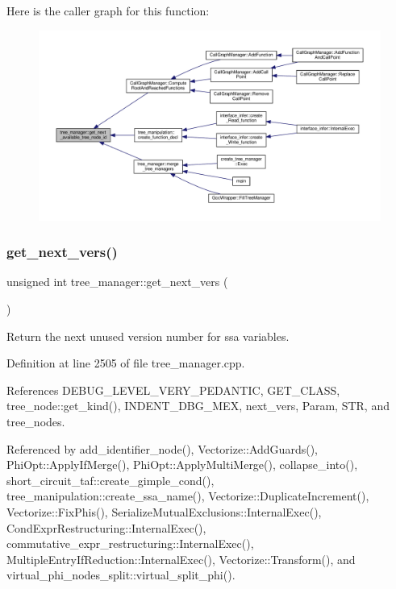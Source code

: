 Here is the caller graph for this function\+:
\nopagebreak
\begin{figure}[H]
\begin{center}
\leavevmode
\includegraphics[width=350pt]{d2/ddd/classtree__manager_a7adac56ed0eef2f391ac2a7ee691f04e_icgraph}
\end{center}
\end{figure}
\mbox{\label{classtree__manager_a7cf60d6250535345f863880c615e7d95}} 
\subsubsection{\texorpdfstring{get\+\_\+next\+\_\+vers()}{get\_next\_vers()}}
{\footnotesize\ttfamily unsigned int tree\+\_\+manager\+::get\+\_\+next\+\_\+vers (\begin{DoxyParamCaption}{ }\end{DoxyParamCaption})}



Return the next unused version number for ssa variables. 



Definition at line 2505 of file tree\+\_\+manager.\+cpp.



References D\+E\+B\+U\+G\+\_\+\+L\+E\+V\+E\+L\+\_\+\+V\+E\+R\+Y\+\_\+\+P\+E\+D\+A\+N\+T\+IC, G\+E\+T\+\_\+\+C\+L\+A\+SS, tree\+\_\+node\+::get\+\_\+kind(), I\+N\+D\+E\+N\+T\+\_\+\+D\+B\+G\+\_\+\+M\+EX, next\+\_\+vers, Param, S\+TR, and tree\+\_\+nodes.



Referenced by add\+\_\+identifier\+\_\+node(), Vectorize\+::\+Add\+Guards(), Phi\+Opt\+::\+Apply\+If\+Merge(), Phi\+Opt\+::\+Apply\+Multi\+Merge(), collapse\+\_\+into(), short\+\_\+circuit\+\_\+taf\+::create\+\_\+gimple\+\_\+cond(), tree\+\_\+manipulation\+::create\+\_\+ssa\+\_\+name(), Vectorize\+::\+Duplicate\+Increment(), Vectorize\+::\+Fix\+Phis(), Serialize\+Mutual\+Exclusions\+::\+Internal\+Exec(), Cond\+Expr\+Restructuring\+::\+Internal\+Exec(), commutative\+\_\+expr\+\_\+restructuring\+::\+Internal\+Exec(), Multiple\+Entry\+If\+Reduction\+::\+Internal\+Exec(), Vectorize\+::\+Transform(), and virtual\+\_\+phi\+\_\+nodes\+\_\+split\+::virtual\+\_\+split\+\_\+phi().

